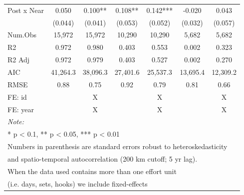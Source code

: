 \begin{table}
\begin{tabular}[t]{lcccccc}
\hline
\hspace{1em}Post x Near & 0.050 & 0.100** & 0.108** & 0.142*** & -0.020 & 0.043\\
\hspace{1em} & (0.044) & (0.041) & (0.053) & (0.052) & (0.032) & (0.057)\\
\hspace{1em}Num.Obs & 15,972 & 15,972 & 10,290 & 10,290 & 5,682 & 5,682\\
\hspace{1em}R2 & 0.972 & 0.980 & 0.403 & 0.553 & 0.002 & 0.323\\
\hspace{1em}R2 Adj & 0.972 & 0.979 & 0.403 & 0.527 & 0.002 & 0.270\\
\hspace{1em}AIC & 41,264.3 & 38,096.3 & 27,401.6 & 25,537.3 & 13,695.4 & 12,309.2\\
\hspace{1em}RMSE & 0.88 & 0.75 & 0.92 & 0.79 & 0.81 & 0.66\\
\midrule
FE: id &  & X &  & X &  & X\\
FE: year &  & X &  & X &  & X\\
\midrule
\bottomrule
\multicolumn{7}{l}{\rule{0pt}{1em}\textit{Note: }}\\
\multicolumn{7}{l}{\rule{0pt}{1em}* p < 0.1, ** p < 0.05, *** p < 0.01}\\
\multicolumn{7}{l}{\rule{0pt}{1em}Numbers in parenthesis are standard errors robust to heteroskedasticity}\\
\multicolumn{7}{l}{\rule{0pt}{1em}and spatio-temporal autocorrelation (200 km cutoff; 5 yr lag).}\\
\multicolumn{7}{l}{\rule{0pt}{1em}When the data used contains more than one effort unit}\\
\multicolumn{7}{l}{\rule{0pt}{1em}(i.e. days, sets, hooks) we include fixed-effects}\\
\end{tabular}
\end{table}